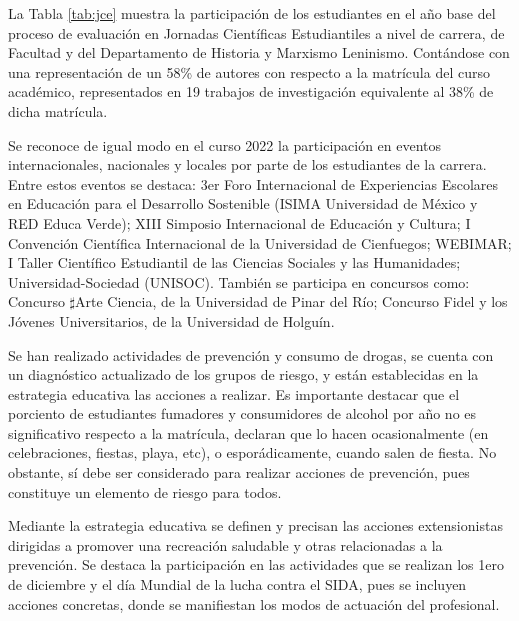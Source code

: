 La Tabla \ref{tab:jce} muestra la participación de los estudiantes en el año base del proceso de evaluación en Jornadas Científicas Estudiantiles a nivel de carrera, de Facultad y del Departamento de Historia y Marxismo Leninismo. Contándose con una representación de un 58\% de autores con respecto a la matrícula del curso académico, representados en 19 trabajos de investigación equivalente al 38\% de dicha matrícula. 

Se reconoce de igual modo en el curso 2022 la participación en eventos internacionales, nacionales y locales por parte de los estudiantes de la carrera. Entre estos eventos se destaca: 3er Foro Internacional de Experiencias Escolares en Educación para el Desarrollo Sostenible (ISIMA Universidad de México y RED Educa Verde); XIII Simposio Internacional de Educación y Cultura; I Convención Científica Internacional de la Universidad de Cienfuegos; WEBIMAR; I Taller Científico Estudiantil de las Ciencias Sociales y las Humanidades; Universidad-Sociedad (UNISOC). También se participa en concursos como: Concurso $\sharp$Arte Ciencia, de la Universidad de Pinar del Río; Concurso Fidel y los Jóvenes Universitarios, de la Universidad de Holguín.

Se han realizado actividades de prevención y consumo de drogas, se cuenta con un diagnóstico actualizado de los grupos de riesgo, y están establecidas en la estrategia educativa las acciones a realizar. Es importante destacar que el porciento de estudiantes fumadores y consumidores de alcohol por año no es significativo respecto a la matrícula, declaran que lo hacen ocasionalmente (en celebraciones, fiestas, playa, etc), o esporádicamente, cuando salen de fiesta. No obstante, sí debe ser considerado para realizar acciones de prevención, pues constituye un elemento de riesgo para todos.

Mediante la estrategia educativa se definen y precisan las acciones extensionistas dirigidas a promover una recreación saludable y otras relacionadas a la prevención. Se destaca la participación en las actividades que se realizan los 1ero de diciembre y el día Mundial de la lucha contra el SIDA, pues se incluyen acciones concretas, donde se manifiestan los modos de actuación del profesional.